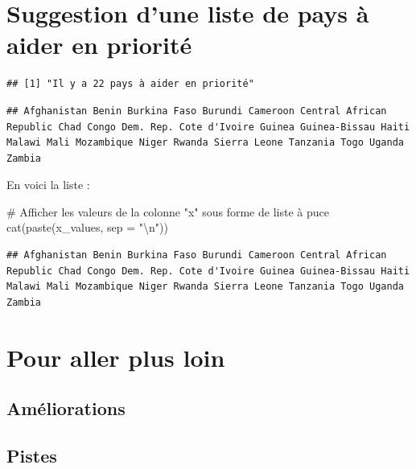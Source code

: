 \documentclass[
]{article}
\newenvironment{Shaded}{}{}
\newcommand{\AttributeTok}[1]{#1}
\newcommand{\CommentTok}[1]{\textcolor[rgb]{0.00,0.50,0.00}{#1}}
\newcommand{\FunctionTok}[1]{#1}
\newcommand{\NormalTok}[1]{#1}
\newcommand{\SpecialCharTok}[1]{\textcolor[rgb]{0.00,0.50,0.50}{#1}}
\newcommand{\StringTok}[1]{\textcolor[rgb]{0.00,0.50,0.50}{#1}}
\begin{document}
\hypertarget{suggestion-dune-liste-de-pays-uxe0-aider-en-priorituxe9}{%
\section{Suggestion d'une liste de pays à aider en
priorité}\label{suggestion-dune-liste-de-pays-uxe0-aider-en-priorituxe9}}

\begin{verbatim}
## [1] "Il y a 22 pays à aider en priorité"
\end{verbatim}

\begin{verbatim}
## Afghanistan Benin Burkina Faso Burundi Cameroon Central African Republic Chad Congo Dem. Rep. Cote d'Ivoire Guinea Guinea-Bissau Haiti Malawi Mali Mozambique Niger Rwanda Sierra Leone Tanzania Togo Uganda Zambia
\end{verbatim}

En voici la liste :

\begin{Shaded}
\begin{Highlighting}[]
\CommentTok{\# Afficher les valeurs de la colonne "x" sous forme de liste à puce}
\FunctionTok{cat}\NormalTok{(}\FunctionTok{paste}\NormalTok{(x\_values, }\AttributeTok{sep =} \StringTok{"}\SpecialCharTok{\textbackslash{}n}\StringTok{"}\NormalTok{))}
\end{Highlighting}
\end{Shaded}

\begin{verbatim}
## Afghanistan Benin Burkina Faso Burundi Cameroon Central African Republic Chad Congo Dem. Rep. Cote d'Ivoire Guinea Guinea-Bissau Haiti Malawi Mali Mozambique Niger Rwanda Sierra Leone Tanzania Togo Uganda Zambia
\end{verbatim}

\hypertarget{pour-aller-plus-loin}{%
\section{Pour aller plus loin}\label{pour-aller-plus-loin}}

\hypertarget{amuxe9liorations}{%
\subsection{Améliorations}\label{amuxe9liorations}}

\hypertarget{pistes}{%
\subsection{Pistes}\label{pistes}}
\end{document}
